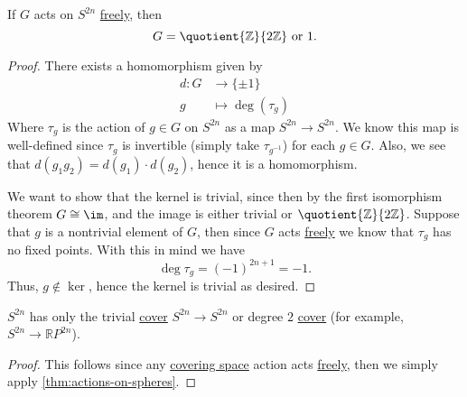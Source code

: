 \begin{theorem}\label{thm:actions-on-spheres}
	If \(G\) acts on \(S^{2n}\) \hyperref[def:free-group]{freely}, then
	\[
		G = \quotient{\mathbb{Z}}{2\mathbb{Z}} \text{ or } 1.
	\]
\end{theorem}
\begin{proof}
	There exists a homomorphism given by
	\[
		\begin{split}
			d\colon G & \to \{\pm 1\}        \\
			g & \mapsto \deg(\tau_g)
		\end{split}
	\]
	Where \(\tau_g\) is the action of \(g \in G\) on \(S^{2n}\) as a map \(S^{2n} \to S^{2n}\). We know this map is well-defined since \(\tau_g\) is invertible
	(simply take \(\tau_{g^{-1}}\)) for each \(g \in G\). Also, we see that \(d(g_1 g_2) = d(g_1) \cdot d(g_2)\), hence it is a homomorphism.

	We want to show that the kernel is trivial, since then by the first isomorphism theorem \(G \cong \im\), and the image is either trivial or
	\(\quotient{\mathbb{Z}}{2\mathbb{Z}}\). Suppose that \(g\) is a nontrivial element of \(G\), then since \(G\) acts \hyperref[def:free-group]{freely} we know that
	\(\tau_g\) has no fixed points. With this in mind we have
	\[
		\deg \tau_g = (-1)^{2n + 1} = - 1.
	\]
	Thus, \(g \not\in \ker\), hence the kernel is trivial as desired.
\end{proof}

\begin{corollary}
	\(S^{2n}\) has only the trivial \hyperref[def:covering-space]{cover} \(S^{2n} \to S^{2n}\) or degree
	\(2\) \hyperref[def:covering-space]{cover} (for example, \(S^{2n} \to \mathbb{R}P^{2n}\)).
\end{corollary}
\begin{proof}
	This follows since any \hyperref[def:covering-space]{covering space} action acts \hyperref[def:free-group]{freely}, then we
	simply apply \autoref{thm:actions-on-spheres}.
\end{proof}

